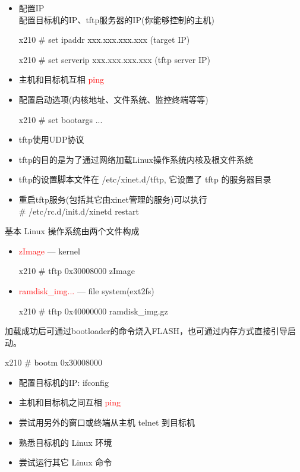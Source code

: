 \begin{itemize}
  \item 配置IP\\
        配置目标机的IP、tftp服务器的IP(你能够控制的主机)

      x210 \# set ipaddr xxx.xxx.xxx.xxx (target IP)

      x210 \# set serverip xxx.xxx.xxx.xxx (tftp server IP)
  \item 主机和目标机互相 \textcolor{red}{ping}
  \item 配置启动选项(内核地址、文件系统、监控终端等等)

      x210 \# set bootargs ...
\end{itemize}
\endslide

\begin{itemize}
  \item tftp使用UDP协议
  \item tftp的目的是为了通过网络加载Linux操作系统内核及根文件系统
  \item tftp的设置脚本文件在 /etc/xinet.d/tftp, 它设置了 tftp 的服务器目录
  \item 重启tftp服务(包括其它由xinet管理的服务)可以执行\\
        \# /etc/rc.d/init.d/xinetd restart
\end{itemize}
\endslide

基本 Linux 操作系统由两个文件构成
\begin{itemize}
  \item \textcolor{red}{zImage} --- kernel

      x210 \# tftp 0x30008000 zImage
  \item \textcolor{red}{ramdisk\_img...}  --- file system(ext2fs)

      x210 \# tftp 0x40000000 ramdisk\_img.gz
\end{itemize}
加载成功后可通过bootloader的命令烧入FLASH，也可通过内存方式直接引导启动。

   x210 \# bootm 0x30008000
\endslide

\begin{itemize}
  \item 配置目标机的IP: ifconfig
  \item 主机和目标机之间互相 \textcolor{red}{ping}
  \item 尝试用另外的窗口或终端从主机 telnet 到目标机
  \item 熟悉目标机的 Linux 环境
  \item 尝试运行其它 Linux 命令
\end{itemize}
\endslide

